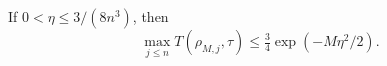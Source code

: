 \begin{lemma}\label{lem:collective}
If $0<\eta\le3/(8n^3)$, then
\begin{equation}
 \max_{j\le n}T(\rho_{M,j},\tau)
 \le\tfrac34\exp(-M\eta^2/2).
 \label{eq:collectiveupper}
\end{equation}
\end{lemma}
